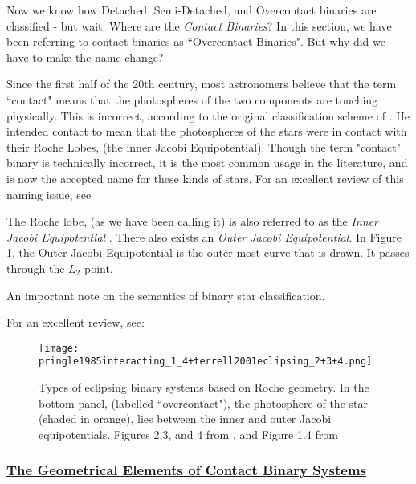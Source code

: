 \documentclass[12pt]{article} %
\numberwithin{equation}{section} %
\begin{document}
Now we know how Detached, Semi-Detached, and Overcontact binaries are classified - but wait: Where are the \emph{Contact Binaries}? In this section, we have been referring to contact binaries as ``Overcontact Binaries". But why did we have to make the name change?

Since the first half of the 20th century, most astronomers believe that the term ``contact" means that the photospheres of the two components are touching physically. This is incorrect, according to the original classification scheme of \citet{kopal1959close}. He intended contact to mean that the photospheres of the stars were in contact with their Roche Lobes, (the inner Jacobi Equipotential). Though the term "contact" binary is technically incorrect, it is the most common usage in the literature, and is now the accepted name for these kinds of stars. For an excellent review of this naming issue, see \citet{wilson2001binary}

The Roche lobe, (as we have been calling it) is also referred to as the \emph{Inner Jacobi Equipotential} . There also exists an \emph{Outer Jacobi Equipotential}. In Figure \ref{fig: pringle1985interacting_1_4+terrell2001eclipsing_2+3+4}, the Outer Jacobi Equipotential is the outer-most curve that is drawn. It passes through the $L_{2}$ point.

An important note on the semantics of binary star classification. \citet{kuiper1941interpretation}

For an excellent review, see: \citep{kallrath2009eclipsing}

\begin{figure}[H]
\centering
\texttt{[image: pringle1985interacting\_1\_4+terrell2001eclipsing\_2+3+4.png]}
\caption{Types of eclipsing binary systems based on Roche geometry. In the bottom panel, (labelled ``overcontact"), the photosphere of the star (shaded in orange), lies between the inner and outer Jacobi equipotentials. Figures 2,3, and 4 from \citet{terrell2001eclipsing}, and Figure 1.4 from \citet{pringle1985interacting}}
\label{fig: pringle1985interacting_1_4+terrell2001eclipsing_2+3+4}
\end{figure}

\subsubsection[The Geometrical Elements of Contact Binary Systems]{\hyperlink{toc}{The Geometrical Elements of Contact Binary Systems}} \label{sec: The Geometrical Elements of Contact Binary Systems}
\end{document}
